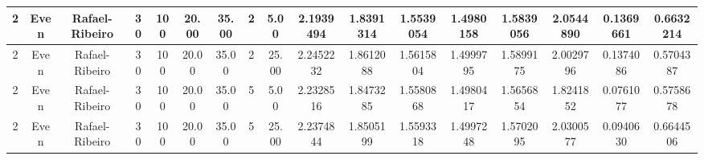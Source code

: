 \documentclass[a4paper]{article}
\begin{document}
\begin{center}
\begin{tabular}{ | c | c | c | c | c | c | c | c | c | c | c | c | c | c | c | c | c | }
		\hline
		2	&	Even	&	Rafael-Ribeiro	&	30	&	100	&	20.00	&	35.00	&	2	&	5.00	&	2.1939494	&	1.8391314	&	1.5539054	&	1.4980158	&	1.5839056	&	2.0544890	&	0.1369661	&	0.6632214 \\
		\hline
		2	&	Even	&	Rafael-Ribeiro	&	30	&	100	&	20.00	&	35.00	&	2	&	25.00	&	2.2452232	&	1.8612088	&	1.5615804	&	1.4999795	&	1.5899175	&	2.0029796	&	0.1374086	&	0.5704387 \\
		\hline
		2	&	Even	&	Rafael-Ribeiro	&	30	&	100	&	20.00	&	35.00	&	5	&	5.00	&	2.2328516	&	1.8473285	&	1.5580868	&	1.4980417	&	1.5656854	&	1.8241852	&	0.0761077	&	0.5758678 \\
		\hline
		2	&	Even	&	Rafael-Ribeiro	&	30	&	100	&	20.00	&	35.00	&	5	&	25.00	&	2.2374844	&	1.8505199	&	1.5593318	&	1.4997248	&	1.5702095	&	2.0300577	&	0.0940630	&	0.6644506 \\
		\hline
	\end{tabular}
	\label{tab:results}
\end{center}
\end{document}
